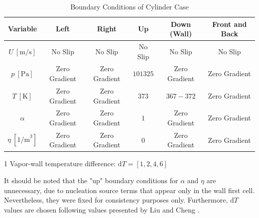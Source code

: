 \documentclass[12pt]{article}
\numberwithin{equation}{section}
\begin{document}
\begin{table}[H]
    \centering
    \begin{threeparttable}[b]
    
    \caption{Boundary Conditions of Cylinder Case}
    \renewcommand{\arraystretch}{1.3}
    \begin{tabular}{||c|c|c|c|c|c||}
    \hline
    \textbf{Variable} & \textbf{Left}& \textbf{Right}& \textbf{Up} & \textbf{Down (Wall)}& \textbf{Front and Back}\\ \hline\hline
     $U \:[\mathrm{m/s}]$&No Slip&No Slip&No Slip&No Slip&No Slip\\\hline
     $p\: [\mathrm{Pa}]$&Zero Gradient& Zero Gradient&$101325$&Zero Gradient&Zero Gradient \\\hline
     $T\: [\mathrm{K}]$&Zero Gradient&Zero Gradient&$373$&$367-372$ \tnote{1}&Zero Gradient\\ \hline
     $\alpha$&Zero Gradient&Zero Gradient&$1$&Zero Gradient&Zero Gradient\\\hline
     $\eta\: [1\mathrm{/m}^3]$&Zero Gradient&Zero Gradient&$0$&Zero Gradient&Zero Gradient\\\hline
     \end{tabular}
     \begin{tablenotes}
        \item [1] Vapor-wall temperature difference: $\mathrm{d}T=[1,2,4,6]$
    \end{tablenotes}
    \label{t:flatplate BC}
    \end{threeparttable}
\end{table}
It should be noted that the "up" boundary conditions for $\alpha$ and $\eta$ are unnecessary, due to nucleation source terms that appear only in the wall first cell. Nevertheless, they were fixed for consistency purposes only. Furthermore, $\mathrm{d}T$ values are chosen following values presented by Liu and Cheng \cite{liu2015dropwise}.
\end{document}
